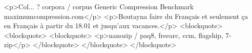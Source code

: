 <p>Col... ? corpora / corpus Generic Compression Benchmark maximumcompression.com</p>
<p>Boutayna faire du Français et seulement ça en Français à partir du 18.01 et jusqu'aux vacances.</p>
<blockquote>
<blockquote>
<blockquote>
<p>nanozip / paq8, freearc, ccm, flagship, 7-zip</p>
</blockquote>
</blockquote>
</blockquote>
